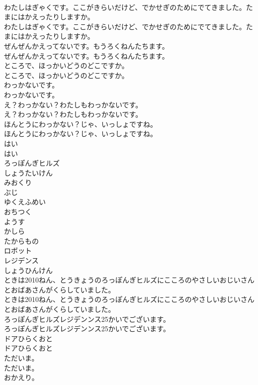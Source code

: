 \documentclass[8pt]{extreport}
\begin{document}
\begin{CJK}{UTF8}{min}
\\	わたしはぎゃくです。ここがきらいだけど、でかせぎのためにでてきました。たまにはかえったりしますか。	
\\	わたしはぎゃくです。ここがきらいだけど、でかせぎのためにでてきました。たまにはかえったりしますか。 
\\	ぜんぜんかえってないです。もうろくねんたちます。	
\\	ぜんぜんかえってないです。もうろくねんたちます。 
\\	ところで、ほっかいどうのどこですか。	
\\	ところで、ほっかいどうのどこですか。 
\\	わっかないです。	
\\	わっかないです。 
\\	え？わっかない？わたしもわっかないです。	
\\	え？わっかない？わたしもわっかないです。 
\\	ほんとうにわっかない？じゃ、いっしょですね。	
\\	ほんとうにわっかない？じゃ、いっしょですね。 
\\	はい	
\\	はい 
\\	ろっぽんぎヒルズ
\\	しょうたいけん
\\	みおくり
\\	ぶじ
\\	ゆくえふめい
\\	おちつく
\\	ようす
\\	かしら
\\	たからもの
\\	ロボット
\\	レジデンス
\\	しょうひんけん
\\	ときは2010ねん、とうきょうのろっぽんぎヒルズにこころのやさしいおじいさんとおばあさんがくらしていました。
\\	ときは2010ねん、とうきょうのろっぽんぎヒルズにこころのやさしいおじいさんとおばあさんがくらしていました。
\\	ろっぽんぎヒルズレジデンンス25かいでございます。	
\\	ろっぽんぎヒルズレジデンンス25かいでございます。 
\\	ドアひらくおと
\\	ドアひらくおと
\\	ただいま。	
\\	ただいま。 
\\	おかえり。	

\end{CJK}
\end{document}
